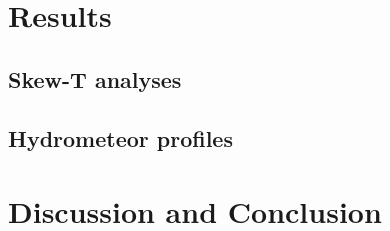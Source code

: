 \documentclass[alpha-refs]{wiley-article}
\begin{document}

\section{Results}

\subsection{Skew-T analyses}

\subsection{Hydrometeor profiles}

\subsection{}

\section{Discussion and Conclusion}
\end{document}
